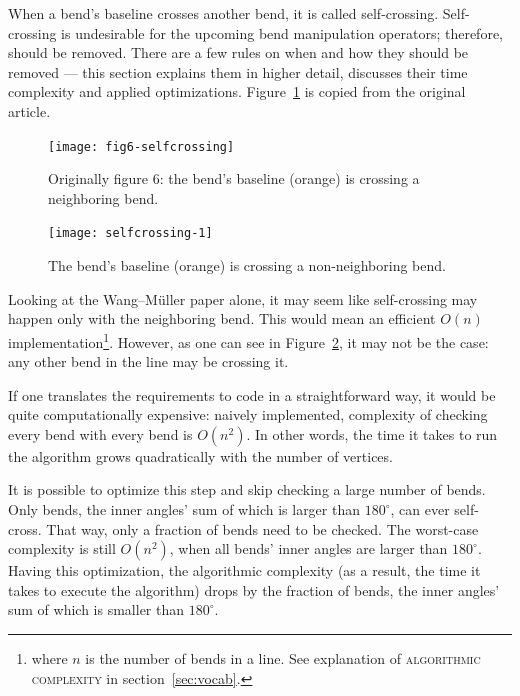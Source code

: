 \documentclass[a4paper]{article}
\newcommand{\WM}{Wang--M{\"u}ller}
\begin{document}
When a bend's baseline crosses another bend, it is called self-crossing.
Self-crossing is undesirable for the upcoming bend manipulation operators; therefore,
should be removed. There are a few rules on when and how they should be removed
--- this section explains them in higher detail, discusses their time
complexity and applied optimizations. Figure~\ref{fig:fig6-selfcrossing} is
copied from the original article.

\begin{figure}[ht]
    \centering
    \texttt{[image: fig6-selfcrossing]}
    \caption{Originally figure 6: the bend's baseline (orange) is crossing a neighboring bend.}
    \label{fig:fig6-selfcrossing}
\end{figure}

\begin{figure}[ht]
    \centering
    \texttt{[image: selfcrossing-1]}
    \caption{The bend's baseline (orange) is crossing a non-neighboring bend.}
    \label{fig:selfcrossing-1-non-neighbor}
\end{figure}


Looking at the {\WM} paper alone, it may seem like self-crossing may happen
only with the neighboring bend. This would mean an efficient $O(n)$
implementation\footnote{where $n$ is the number of bends in a line. See
explanation of \textsc{algorithmic complexity} in section~\ref{sec:vocab}.}.
However, as one can see in Figure~\ref{fig:selfcrossing-1-non-neighbor}, it may
not be the case: any other bend in the line may be crossing it.

If one translates the requirements to code in a straightforward way, it would
be quite computationally expensive: naively implemented, complexity of checking
every bend with every bend is $O(n^2)$. In other words, the time it takes to
run the algorithm grows quadratically with the number of vertices.

It is possible to optimize this step and skip checking a large number of bends.
Only bends, the inner angles' sum of which is larger than $180^\circ$, can ever
self-cross. That way, only a fraction of bends need to be checked. The
worst-case complexity is still $O(n^2)$, when all bends' inner angles are
larger than $180^\circ$. Having this optimization, the algorithmic complexity
(as a result, the time it takes to execute the algorithm) drops by the
fraction of bends, the inner angles' sum of which is smaller than $180^\circ$.
\end{document}
